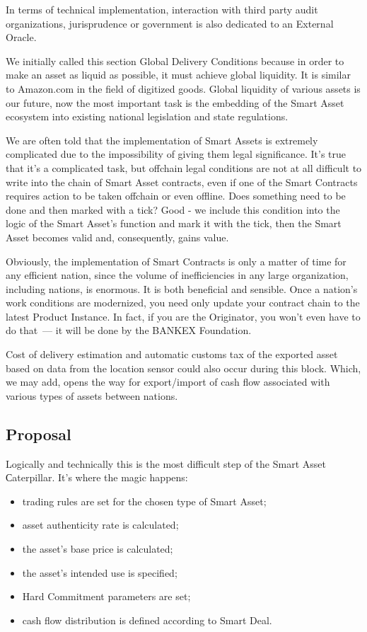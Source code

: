 \documentclass{article}
\begin{document}
\begin{multicols}{2}
In terms of technical implementation, interaction with third party audit organizations, jurisprudence or government is also dedicated to an External Oracle.

We initially called this section Global Delivery Conditions because in order to make an asset as liquid as possible, it must achieve global liquidity. It is similar to Amazon.com in the field of digitized goods. Global liquidity of various assets is our future, now the most important task is the embedding of the Smart Asset ecosystem into existing national legislation and state regulations. 

We are often told that the implementation of Smart Assets is extremely complicated due to the impossibility of giving them legal significance. It’s true that it’s a complicated task, but offchain legal conditions are not at all difficult to write into the chain of Smart Asset contracts, even if one of the Smart Contracts requires action to be taken offchain or even offline. Does something need to be done and then marked with a tick? Good - we include this condition into the logic of the Smart Asset’s function and mark it with the tick, then the Smart Asset becomes valid and, consequently, gains value. 

Obviously, the implementation of Smart Contracts is only a matter of time for any efficient nation, since the volume of inefficiencies in any large organization, including nations, is enormous. It is both beneficial and sensible. Once a nation’s work conditions are modernized, you need only update your contract chain to the latest Product Instance. In fact, if you are the Originator, you won’t even have to do that~--- it will be done by the BANKEX Foundation. 

Cost of delivery estimation and automatic customs tax of the exported asset based on data from the location sensor could also occur during this block. Which, we may add, opens the way for export/import of cash flow associated with various types of assets between nations. 

\subsection{Proposal}

Logically and technically this is the most difficult step of the Smart Asset Сaterpillar. 
It’s where the magic happens:

\begin{itemize}
\item trading rules are set for the chosen type of Smart Asset;
\item asset authenticity rate is calculated;
\item the asset's base price is calculated;
\item the asset's intended use is specified;
\item Hard Commitment parameters are set;
\item cash flow distribution is defined according to Smart Deal.
\end{itemize}


\end{multicols}
\end{document}
